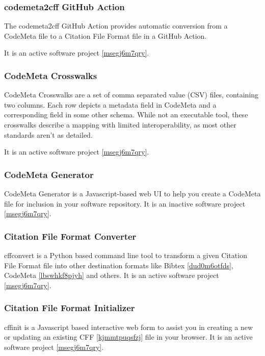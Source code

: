 \documentclass{article}
\begin{document}
\subsubsection{codemeta2cff GitHub Action}\label{tk14z3o75c5t}
The codemeta2cff GitHub Action\cite{138880/U54AXTI4} provides automatic conversion from a CodeMeta file to a Citation File Format file in a GitHub Action.

It is an active software project \ref{msegj6m7qry}.



\subsubsection{CodeMeta Crosswalks}\label{ks3fezwj69ji}
CodeMeta Crosswalks \cite{11045035/2G9VU24E} are a set of comma separated value (CSV) files, containing two columns. Each row depicts a metadata field in CodeMeta and a corresponding field in some other schema. While not an executable tool, these crosswalks describe a mapping with limited interoperability, as most other standards aren’t as detailed.

It is an active software project \ref{msegj6m7qry}.



\subsubsection{CodeMeta Generator}\label{vuql4sg8sy2}
CodeMeta Generator \cite{11045035/BGVLLAZ8} is a Javascript-based web UI to help you create a CodeMeta file for inclusion in your software repository. It is an inactive software project \ref{msegj6m7qry}.



\subsubsection{Citation File Format Converter}\label{dfofurxomlo4}
cffconvert \cite{11045035/3EAAUM9S} is a Python based command line tool to transform a given Citation File Format  file into other destination formats like Bibtex \ref{dud0m6otfds}, CodeMeta \ref{lbswhkf8pjyh} and others. It is an active software project \ref{msegj6m7qry}.



\subsubsection{Citation File Format Initializer}\label{bv2fu3l3kcxk}
cffinit \cite{11045035/244Q39FZ} is a Javascript based interactive web form to assist you in creating a new or updating an existing CFF \ref{kjmmtpuqsfzj} file in your browser. It is an active software project \ref{msegj6m7qry}.
\end{document}
